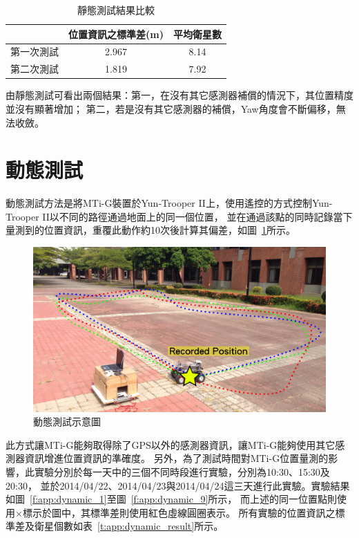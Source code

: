 \begin{table}[h!]
	\centering
	\caption{靜態測試結果比較}
	\label{t:app:stationary_result}
	\begin{tabular}{| l | c | c |}
		\hline
		 		& 位置資訊之標準差(m)	& 平均衛星數 \\ \hline
		第一次測試	& 2.967			& 8.14 \\ \hline
		第二次測試	& 1.819			& 7.92 \\
		\hline
	\end{tabular}
\end{table}

由靜態測試可看出兩個結果：第一，在沒有其它感測器補償的情況下，其位置精度並沒有顯著增加；
第二，若是沒有其它感測器的補償，Yaw角度會不斷偏移，無法收斂。

\section*{動態測試}
動態測試方法是將MTi-G裝置於Yun-Trooper II上，使用遙控的方式控制Yun-Trooper II以不同的路徑通過地面上的同一個位置，
並在通過該點的同時記錄當下量測到的位置資訊，重覆此動作約10次後計算其偏差，如圖~\ref{f:app:dynamic_env}所示。
\begin{figure}
	\centering
	\includegraphics[width=\textwidth]{figures/MTiGTest/MTiG_env}
	\caption{動態測試示意圖}
	\label{f:app:dynamic_env}
\end{figure}

此方式讓MTi-G能夠取得除了GPS以外的感測器資訊，讓MTi-G能夠使用其它感測器資訊增進位置資訊的準確度。
另外，為了測試時間對MTi-G位置量測的影響，此實驗分別於每一天中的三個不同時段進行實驗，分別為10:30、15:30及20:30，
並於2014/04/22、2014/04/23與2014/04/24這三天進行此實驗。實驗結果如圖~\ref{f:app:dynamic_1}至圖~\ref{f:app:dynamic_9}所示，
而上述的同一位置點則使用$\times$標示於圖中，其標準差則使用紅色虛線圓圈表示。
所有實驗的位置資訊之標準差及衛星個數如表~\ref{t:app:dynamic_result}所示。

